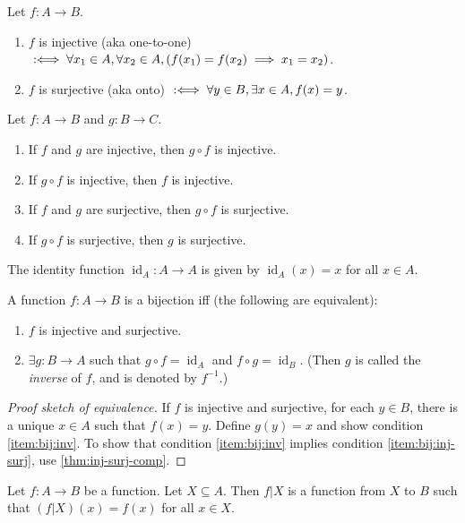 \documentclass[a4paper, 12pt, fleqn]{article}
\DeclareMathOperator{\idFunc}{id}
\begin{document}
\begin{definition}
Let $f: A \to B$.
\begin{enumerate}
\item $f$ is injective (aka one-to-one)
    $\;:\Longleftrightarrow\; \forall x_1 \in A, \forall x_2 \in A, (f(x_1) = f(x_2) \implies x_1 = x_2)$.
\item $f$ is surjective (aka onto)
    $\;:\Longleftrightarrow\; \forall y \in B, \exists x \in A, f(x) = y$.
\end{enumerate}
\end{definition}

\begin{lemma}[Composition]
\label{thm:inj-surj-comp}
Let $f: A \to B$ and $g: B \to C$.
\begin{enumerate}
\item If $f$ and $g$ are injective, then $g \circ f$ is injective.
\item If $g \circ f$ is injective, then $f$ is injective.
\item If $f$ and $g$ are surjective, then $g \circ f$ is surjective.
\item If $g \circ f$ is surjective, then $g$ is surjective.
\end{enumerate}
\end{lemma}

\begin{definition}[Identity]
The identity function $\idFunc_A: A \to A$ is given by $\idFunc_A(x) = x$ for all $x \in A$.
\end{definition}

\begin{definition}[Bijection]
A function $f: A \to B$ is a bijection iff (the following are equivalent):
\begin{enumerate}
\item \label{item:bij:inj-surj}$f$ is injective and surjective.
\item \label{item:bij:inv}$\exists g: B \to A$ such that $g \circ f = \idFunc_A$ and $f \circ g = \idFunc_B$.
    (Then $g$ is called the \emph{inverse} of $f$, and is denoted by $f^{-1}$.)
\end{enumerate}
\end{definition}
\begin{proof}[Proof sketch of equivalence]
If $f$ is injective and surjective, for each $y \in B$, there is a unique $x \in A$
such that $f(x) = y$. Define $g(y) = x$ and show condition \ref{item:bij:inv}.
To show that condition \ref{item:bij:inv} implies condition \ref{item:bij:inj-surj},
use \cref{thm:inj-surj-comp}.
\end{proof}

\begin{definition}[Restriction]
Let $f: A \to B$ be a function. Let $X \subseteq A$. Then $f|X$ is a function from $X$ to $B$
such that $(f|X)(x) = f(x)$ for all $x \in X$.
\end{definition}
\end{document}
